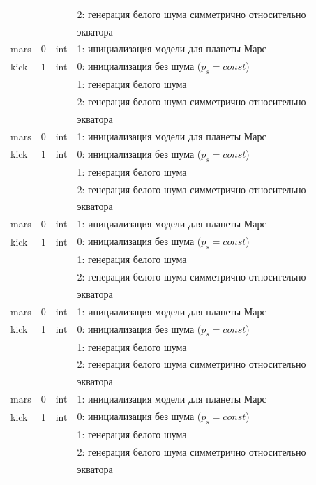 \begin{longtable*}[c]{|l|c|l|l|}
    &   &     & 2: генерация белого шума симметрично относительно \\
    & & & экватора    \\
    mars & 0 & int & 1: инициализация модели для планеты Марс     \\
    kick & 1 & int & 0: инициализация без шума (\(p_s = const\)) \\
    &   &     & 1: генерация белого шума                  \\
    &   &     & 2: генерация белого шума симметрично относительно \\
    & & & экватора    \\
    mars & 0 & int & 1: инициализация модели для планеты Марс     \\
    kick & 1 & int & 0: инициализация без шума (\(p_s = const\)) \\
    &   &     & 1: генерация белого шума                  \\
    &   &     & 2: генерация белого шума симметрично относительно \\
    & & & экватора    \\
    mars & 0 & int & 1: инициализация модели для планеты Марс     \\
    kick & 1 & int & 0: инициализация без шума (\(p_s = const\)) \\
    &   &     & 1: генерация белого шума                  \\
    &   &     & 2: генерация белого шума симметрично относительно \\
    & & & экватора    \\
    mars & 0 & int & 1: инициализация модели для планеты Марс     \\
    kick & 1 & int & 0: инициализация без шума (\(p_s = const\)) \\
    &   &     & 1: генерация белого шума                  \\
    &   &     & 2: генерация белого шума симметрично относительно \\
    & & & экватора    \\
    mars & 0 & int & 1: инициализация модели для планеты Марс     \\
    kick & 1 & int & 0: инициализация без шума (\(p_s = const\)) \\
    &   &     & 1: генерация белого шума                  \\
    &   &     & 2: генерация белого шума симметрично относительно \\
    & & & экватора    \\

\end{longtable*}
